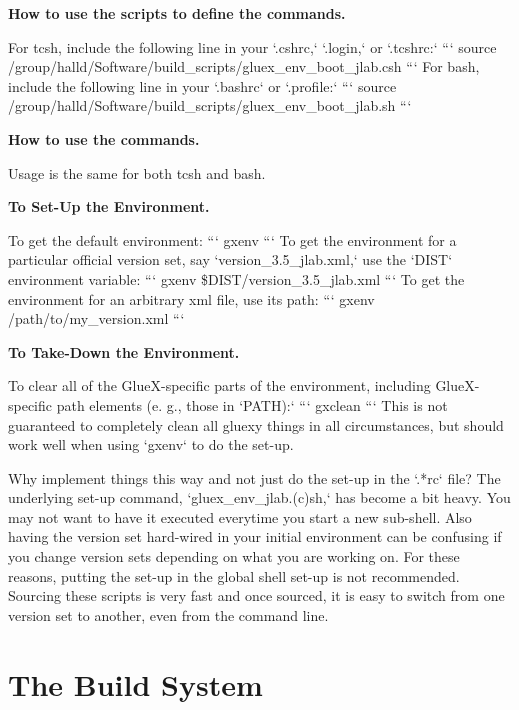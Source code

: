 \documentclass[12pt]{article}
\begin{document}
\begin{description}
\item{\bf How to use the scripts to define the commands.}

For tcsh, include the following line in your `.cshrc,` `.login,` or `.tcshrc:`
```
source /group/halld/Software/build\_scripts/gluex\_env\_boot\_jlab.csh
```
For bash, include the following line in your `.bashrc` or `.profile:`
```
source /group/halld/Software/build\_scripts/gluex\_env\_boot\_jlab.sh
```
\item{\bf How to use the commands.}

Usage is the same for both tcsh and bash.

\begin{description}
\item{\bf To Set-Up the Environment.}

To get the default environment: ``` gxenv ``` To get the environment
for a particular official version set, say `version\_3.5\_jlab.xml,`
use the `DIST` environment variable: ``` gxenv
\$DIST/version\_3.5\_jlab.xml ``` To get the environment for an
arbitrary xml file, use its path: ``` gxenv /path/to/my\_version.xml
```
\item{\bf To Take-Down the Environment.}

To clear all of the GlueX-specific parts of the environment, including
GlueX-specific path elements (e. g., those in `PATH):` ``` gxclean ```
This is not guaranteed to completely clean all gluexy things in all
circumstances, but should work well when using `gxenv` to do the
set-up.

\end{description}
\end{description}

Why implement things this way and not just do the set-up in the `.*rc`
file? The underlying set-up command, `gluex\_env\_jlab.(c)sh,` has
become a bit heavy. You may not want to have it executed everytime you
start a new sub-shell. Also having the version set hard-wired in your
initial environment can be confusing if you change version sets
depending on what you are working on. For these reasons, putting the
set-up in the global shell set-up is not recommended. Sourcing these
scripts is very fast and once sourced, it is easy to switch from one
version set to another, even from the command line.

\section{The Build System}
\end{document}
